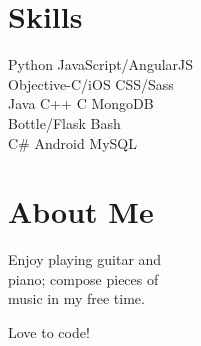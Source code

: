 \documentclass[]{resume}
\begin{document}
\begin{minipage}[t]{0.33\textwidth}
\section{Skills}
\hspace{8pt} Python \textbullet{} JavaScript/AngularJS  \\
\hspace{8pt} Objective-C/iOS \textbullet{} CSS/Sass \\
\hspace{8pt} Java \textbullet{} C++ \textbullet{} C \textbullet{} MongoDB \\
\hspace{8pt} Bottle/Flask \textbullet{} Bash \\
\hspace{8pt} C\# \textbullet{} Android \textbullet{} MySQL
\sectionsep


\section{About Me}
\hspace{8pt}
\begin{tightemize} \item Enjoy playing guitar and \\ piano; compose pieces of \\ music in my free time. \item Love to code! \end{tightemize}
\sectionsep

%
%

\end{minipage}
\hfill
\end{document}

